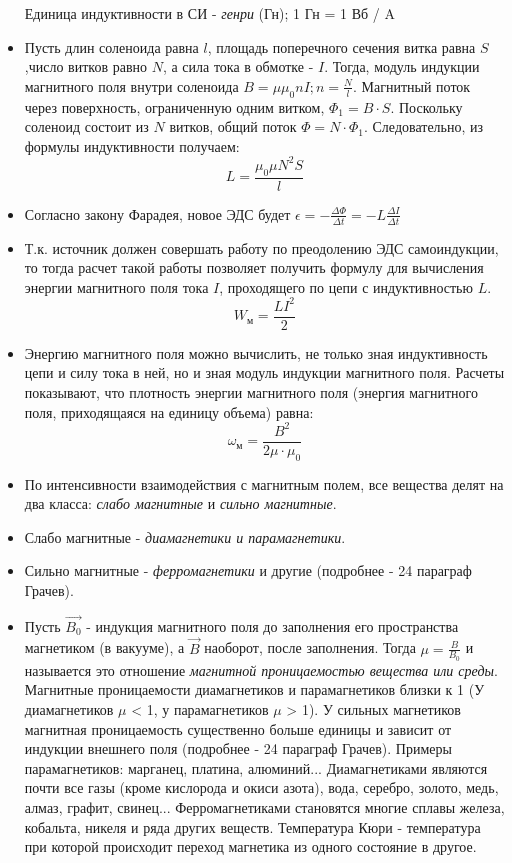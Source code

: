 \documentclass{article}
\begin{document}
\begin{flushleft}
\begin{itemize}
        Единица индуктивности в СИ - \textit{генри} (Гн); 1 Гн = 1 Вб / A
        \item Пусть длин соленоида равна $l$, площадь поперечного сечения витка равна $S$,число витков равно $N$, а сила тока в обмотке - $I$. Тогда, модуль индукции магнитного поля внутри соленоида $B = \mu \mu_0 nI; n = \frac{N}{l}$. Магнитный поток через поверхность, ограниченную одним витком, $\Phi_1 = B \cdot S$. Поскольку соленоид состоит из $N$ витков, общий поток $\Phi = N \cdot \Phi_1$. Следовательно, из формулы индуктивности получаем: \[L = \frac{\mu_0 \mu N^2 S}{l}\]
        \item Согласно закону Фарадея, новое ЭДС будет $\epsilon = - \frac{\Delta \Phi}{\Delta t} = -L \frac{\Delta I}{\Delta t}$
        \item Т.к. источник должен совершать работу по преодолению ЭДС самоиндукции, то тогда расчет такой работы позволяет получить формулу для вычисления энергии магнитного поля тока $I$, проходящего по цепи с индуктивностью $L$. \[W_\text{м} = \frac{LI^2}{2}\]
        \item Энергию магнитного поля можно вычислить, не только зная индуктивность цепи и силу тока в ней, но и зная модуль индукции магнитного поля. Расчеты показывают, что плотность энергии магнитного поля (энергия магнитного поля, приходящаяся на единицу объема) равна: \[\omega_\text{м} = \frac{B^2}{2 \mu \cdot \mu_0}\]
        \item По интенсивности взаимодействия с магнитным полем, все вещества делят на два класса: \textit{слабо магнитные} и \textit{сильно магнитные}. 
        \item Слабо магнитные - \textit{диамагнетики \emph{и} парамагнетики}.
        \item Сильно магнитные - \textit{ферромагнетики} и другие (подробнее - 24 параграф Грачев).
        \item Пусть $\overrightarrow{B_0}$ - индукция магнитного поля до заполнения его пространства магнетиком (в вакууме), а $\overrightarrow{B}$ наоборот, после заполнения. Тогда $\mu = \frac{B}{B_0}$ и называется это отношение \textit{магнитной проницаемостью вещества или среды}. Магнитные проницаемости диамагнетиков и парамагнетиков близки к 1 (У диамагнетиков $\mu$ < 1, у парамагнетиков $\mu$ > 1). У сильных магнетиков магнитная проницаемость существенно больше единицы и зависит от индукции внешнего поля (подробнее - 24 параграф Грачев). Примеры парамагнетиков: марганец, платина, алюминий... Диамагнетиками являются почти все газы (кроме кислорода и окиси азота), вода, серебро, золото, медь, алмаз, графит, свинец... Ферромагнетиками становятся многие сплавы железа, кобальта, никеля и ряда других веществ. Температура Кюри - температура при которой происходит переход магнетика из одного состояние в другое. 
    \end{itemize}

\end{flushleft}
\end{document}
